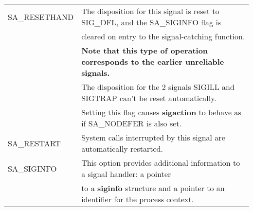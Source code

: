 \documentclass{article}
\begin{document}
\begin{center}
\begin{table}[h!]
\begin{tabular}{|l | l|}
            SA\_RESETHAND    & The disposition for this signal is reset to SIG\_DFL, and the SA\_SIGINFO flag is \\ 
                             & cleared on entry to the signal-catching function. \\
                             & \textbf{Note that this type of operation corresponds to the earlier unreliable signals.} \\
                             & The disposition for the 2 signals SIGILL and SIGTRAP can't be reset automatically. \\
                             & Setting this flag causes \textbf{sigaction} to behave as if SA\_NODEFER is also set. \\
            \hline

            SA\_RESTART      & System calls interrupted by this signal are automatically restarted. \\
            \hline

            SA\_SIGINFO      & This option provides additional information to a signal handler: a pointer \\ 
                             & to a \textbf{siginfo} structure and a pointer to an identifier for the process context. \\
            \hline
        \end{tabular}
    \end{table}
\end{center}

\clearpage
\end{document}

